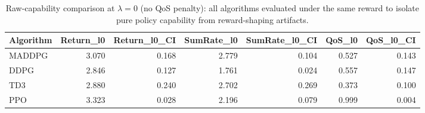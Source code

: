 \begin{table}[t]
\centering
\caption{Raw-capability comparison at $\lambda=0$ (no QoS penalty): all algorithms evaluated under the same reward to isolate pure policy capability from reward-shaping artifacts.}
\label{tab:algorithm_comparison_lambda0}
\begin{tabular}{lrrrrrr}
\toprule
Algorithm & Return\_l0 & Return\_l0\_CI & SumRate\_l0 & SumRate\_l0\_CI & QoS\_l0 & QoS\_l0\_CI \\
\midrule
MADDPG & 3.070 & 0.168 & 2.779 & 0.104 & 0.527 & 0.143 \\
DDPG & 2.846 & 0.127 & 1.761 & 0.024 & 0.557 & 0.147 \\
TD3 & 2.880 & 0.240 & 2.702 & 0.269 & 0.373 & 0.100 \\
PPO & 3.323 & 0.028 & 2.196 & 0.079 & 0.999 & 0.004 \\
\bottomrule
\end{tabular}

\end{table}
